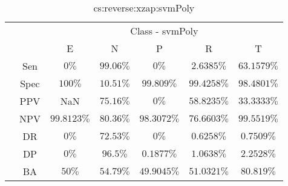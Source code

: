 \begin{table}[!ht]
	\centering
	\begin{tabular}{|c|c|c|c|c|c|c|}
		\cline{3-7}
		\multicolumn{2}{c|}{} & \multicolumn{5}{c|}{Class - svmPoly} \\ \cline{3-7}
		\multicolumn{2}{c|}{} & E & N & P & R & T \\ \hline
		\multirow{7}{*}{\rotatebox{90}{Statistics}} & Sen & $0\%$ & $99.06\%$ & $0\%$ & $2.6385\%$ & $63.1579\%$ \\ \cline{2-7}
		 & Spec & $100\%$ & $10.51\%$ & $99.809\%$ & $99.4258\%$ & $98.4801\%$ \\ \cline{2-7}
		 & PPV & NaN & $75.16\%$ & $0\%$ & $58.8235\%$ & $33.3333\%$ \\ \cline{2-7}
		 & NPV & $99.8123\%$ & $80.36\%$ & $98.3072\%$ & $76.6603\%$ & $99.5519\%$ \\ \cline{2-7}
		 & DR & $0\%$ & $72.53\%$ & $0\%$ & $0.6258\%$ & $0.7509\%$ \\ \cline{2-7}
		 & DP & $0\%$ & $96.5\%$ & $0.1877\%$ & $1.0638\%$ & $2.2528\%$ \\ \cline{2-7}
		 & BA & $50\%$ & $54.79\%$ & $49.9045\%$ & $51.0321\%$ & $80.819\%$ \\ \hline
	\end{tabular}
	\caption{cs:reverse:xzap:svmPoly}
	\label{tab:cs:reverse:xzap:svmPoly}
\end{table}
